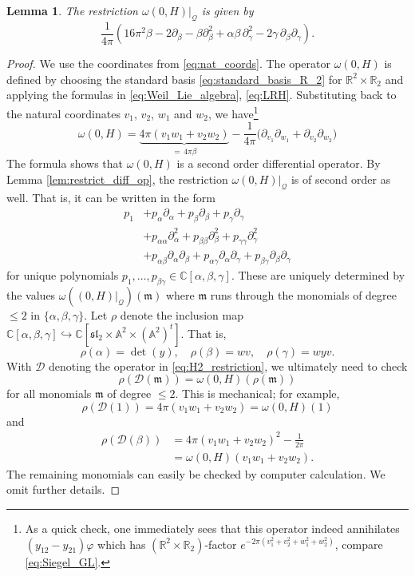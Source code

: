 \documentclass[reqno, 11pt]{amsart} %
\numberwithin{equation}{section}
\theoremstyle{plain}
\newtheorem{lemma}[theorem]{Lemma}
\theoremstyle{definition}
\theoremstyle{remark}
\newcommand{\mbA}{\mathbb{A}}
\newcommand{\mbC}{\mathbb{C}}
\newcommand{\mbR}{\mathbb{R}}
\newcommand{\mcD}{\mathcal{D}}
\newcommand{\mcQ}{\mathcal{Q}}
\newcommand{\mfl}{\mathfrak{l}}
\newcommand{\mfm}{\mathfrak{m}}
\newcommand{\mfs}{\mathfrak{s}}
\newcommand{\mfsl}{\mfs\mfl}
\begin{document}
\begin{lemma}\label{lem:restriction_H_2}
The restriction $ω(0,H)\vert_{\mcQ}$ is given by
\begin{equation}\label{eq:H2_restriction}
\frac{1}{4π}\left(16π^2β - 2\partial_β - β \partial_β^2 + αβ\,\partial_γ^2 - 2γ\,\partial_β\partial_γ\right).
\end{equation}
\end{lemma}
\begin{proof}
We use the coordinates from \eqref{eq:nat_coords}. The operator $ω(0,H)$ is defined by choosing the standard basis \eqref{eq:standard_basis_R_2} for $\mbR^2\times \mbR_2$ and applying the formulas in \eqref{eq:Weil_Lie_algebra}, \eqref{eq:LRH}. Substituting back to the natural coordinates $v_1$, $v_2$, $w_1$ and $w_2$, we have\footnote{As a quick check, one immediately sees that this operator indeed annihilates $(y_{12}-y_{21})φ$ which has $(\mbR^2\times \mbR_2)$-factor $e^{-2π(v_1^2 + v_2^2 + w_1^2 + w_2^2)}$, compare \eqref{eq:Siegel_GL}.}
\begin{equation}\label{eq:omega_2_natural}
ω(0,H) = \underset{=\,4πβ}{\underbrace{4π(v_1w_1 + v_2w_2)}} - \frac{1}{4π}\Big(\partial_{v_1}\partial_{w_1} + \partial_{v_2}\partial_{w_2}\Big)
\end{equation}
The formula shows that $ω(0,H)$ is a second order differential operator. By Lemma \ref{lem:restrict_diff_op}, the restriction $ω(0,H)\vert_{\mcQ}$ is of second order as well. That is, it can be written in the form
\begin{equation}
\begin{aligned}
p_1 & + p_α\partial_α + p_β \partial_β + p_γ\partial_γ\\
& + p_{αα}\partial_α^2 + p_{ββ}\partial_β^2 + p_{γγ}\partial_γ^2\\[1mm]
& + p_{αβ}\partial_α\partial_β + p_{αγ}\partial_α\partial_γ + p_{βγ}\partial_β\partial_γ
\end{aligned}
\end{equation}
for unique polynomials $p_1,\ldots,p_{βγ}\in \mbC[α, β, γ]$. These are uniquely determined by the values $ω((0,H)\vert_{\mcQ})(\mfm)$ where $\mfm$ runs through the monomials of degree $\leq 2$ in $\{α, β, γ\}$. Let $ρ$ denote the inclusion map $\mbC[α, β, γ] \hookrightarrow \mbC[\mfsl_2\times \mbA^2\times (\mbA^2)^t]$. That is,
$$ρ(α) = \det(y),\quad ρ(β) = wv,\quad ρ(γ) = wyv.$$
With $\mcD$ denoting the operator in \eqref{eq:H2_restriction}, we ultimately need to check
$$ρ(\mcD(\mfm)) = ω(0,H)(ρ(\mfm))$$
for all monomials $\mfm$ of degree $\leq 2$. This is mechanical; for example,
$$ρ(\mcD(1)) = 4π(v_1w_1 + v_2w_2) = ω(0,H)(1)$$
and
$$\begin{aligned}
ρ(\mcD(β)) & = 4π(v_1w_1 + v_2w_2)^2 - \frac{1}{2π}\\
& = ω(0,H)(v_1w_1 + v_2w_2).
\end{aligned}$$
The remaining monomials can easily be checked by computer calculation. We omit further details.
\end{proof}
\end{document}

